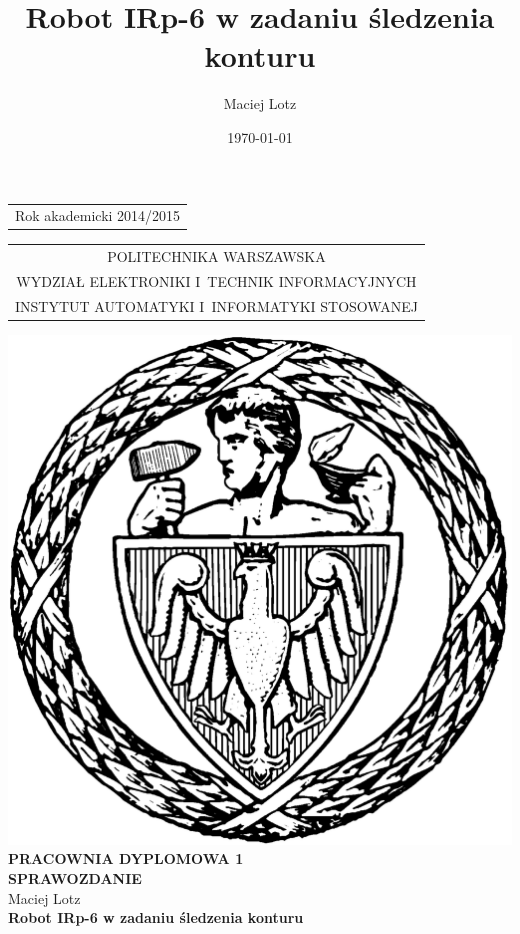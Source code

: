 \documentclass[12pt, a4paper, twoside]{book}
\author{Maciej Lotz }
\title{Robot IRp-6 w zadaniu śledzenia konturu}
\date{\today}
\begin{document}
	\sloppy
		
		
		\thispagestyle{empty}
		
		\begin{titlepage}
			\noindent
			\begin{flushright}
				\begin{tabular}[t]{r}
					\scriptsize Rok akademicki 2014/2015\\[5mm]
				\end{tabular}
			\end{flushright}
			\begin{center}
				\begin{tabular}[t]{c}
					\scriptsize POLITECHNIKA WARSZAWSKA\\
					\scriptsize WYDZIAŁ ELEKTRONIKI I~TECHNIK INFORMACYJNYCH\\
					\scriptsize INSTYTUT AUTOMATYKI I~INFORMATYKI STOSOWANEJ
				\end{tabular}
			\end{center}
			\vfill
			\begin{center}
				\resizebox{3.5cm}{!}
				{
					\includegraphics{images/logo_politechnika.pdf}
				}
				\\[5mm]\textbf{PRACOWNIA DYPLOMOWA 1}\\[3mm] \textbf{SPRAWOZDANIE} \\[15mm]
				\large Maciej Lotz\\[10mm]
				\Large \textbf{Robot \mbox{\mbox{IRp-6}} w zadaniu śledzenia konturu}
			\end{center}
			

\end{titlepage}
\end{document}
